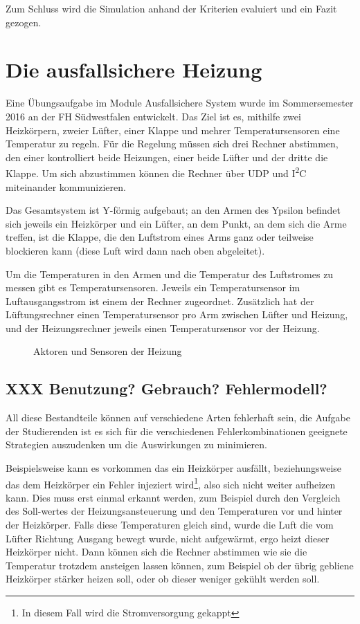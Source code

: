 Zum Schluss wird die Simulation anhand der Kriterien evaluiert und ein Fazit gezogen.

\clearpage
\section{Die ausfallsichere Heizung}\label{heizung}
Eine {\"{U}}bungsaufgabe im Module Ausfallsichere System wurde im Sommersemester 2016 an der FH S{\"{u}}dwestfalen entwickelt. Das Ziel ist es, mithilfe zwei Heizk{\"{o}}rpern, zweier
L{\"{u}}fter, einer Klappe und mehrer Temperatursensoren eine Temperatur zu regeln. F{\"{u}}r die Regelung m{\"{u}}ssen sich drei Rechner abstimmen, den einer kontrolliert
beide Heizungen, einer beide L{\"{u}}fter und der dritte die Klappe. Um sich abzustimmen k{\"{o}}nnen die Rechner {\"{u}}ber UDP und I\textsuperscript{2}C miteinander kommunizieren.

Das Gesamtsystem ist Y-f{\"{o}}rmig aufgebaut; an den Armen des Ypsilon befindet sich jeweils ein Heizk{\"{o}}rper und ein L{\"{u}}fter, an dem Punkt, an dem sich
die Arme treffen, ist die Klappe, die den Luftstrom eines Arms ganz oder teilweise blockieren kann (diese Luft wird dann nach oben abgeleitet).

Um die Temperaturen in den Armen und die Temperatur des Luftstromes zu messen gibt es Temperatursensoren. Jeweils ein Temperatursensor im Luftausgangsstrom ist einem
der Rechner zugeordnet. Zus{\"{a}}tzlich hat der L{\"{u}}ftungsrechner einen Temperatursensor pro Arm zwischen L{\"{u}}fter und Heizung, und der Heizungsrechner jeweils
einen Temperatursensor vor der Heizung.

\begin{figure}
	\centering
	\caption{Aktoren und Sensoren der Heizung}
	\label{fig:heizunghw}
\end{figure}

\subsection{XXX Benutzung? Gebrauch? Fehlermodell?}
All diese Bestandteile k{\"{o}}nnen auf verschiedene Arten fehlerhaft sein, die Aufgabe der Studierenden ist es sich f{\"{u}}r die verschiedenen Fehlerkombinationen
geeignete Strategien auszudenken um die Auswirkungen zu minimieren.

Beispielsweise kann es vorkommen das ein Heizk{\"{o}}rper ausf{\"{a}}llt, beziehungsweise das dem
Heizk{\"{o}}rper ein Fehler injeziert wird\footnote{In diesem Fall wird die Stromversorgung gekappt},
also sich nicht weiter aufheizen kann. Dies muss erst einmal erkannt werden, zum Beispiel
durch den Vergleich des Soll-wertes der Heizungsansteuerung und den Temperaturen vor und hinter der Heizk{\"{o}}rper. Falls diese Temperaturen gleich sind,
wurde die Luft die vom L{\"{u}}fter Richtung Ausgang bewegt wurde, nicht aufgew{\"{a}}rmt, ergo heizt dieser Heizk{\"{o}}rper nicht. Dann k{\"{o}}nnen sich die
Rechner abstimmen wie sie die Temperatur trotzdem ansteigen lassen k{\"{o}}nnen, zum Beispiel ob der {\"{u}}brig gebliene Heizk{\"{o}}rper st{\"{a}}rker heizen
soll, oder ob dieser weniger gek{\"{u}}hlt werden soll.

